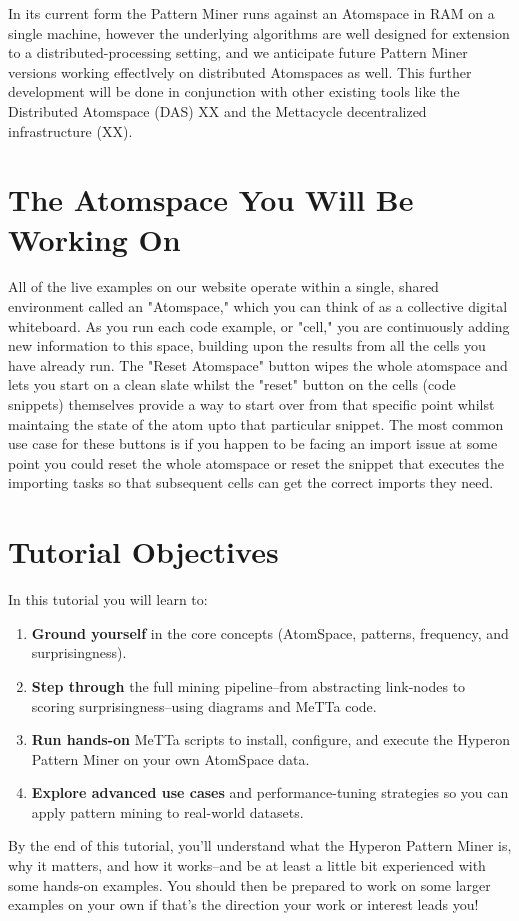 \documentclass{article}
\begin{document}
In its current form the Pattern Miner runs against an Atomspace in RAM on a single machine, however the underlying algorithms are well designed for extension to a distributed-processing setting, and we anticipate future Pattern Miner versions working effectlvely on distributed Atomspaces as well.   This further development will be done in conjunction with other existing tools like the Distributed Atomspace (DAS) XX and the Mettacycle decentralized infrastructure (XX).

\section{The Atomspace You Will Be Working On}

All of the live examples on our website operate within a single, shared environment called an "Atomspace," which you can think of as a collective digital whiteboard. As you run each code example, or "cell," you are continuously adding new information to this space, building upon the results from all the cells you have already run. The "Reset Atomspace" button wipes the whole atomspace and lets you start on a clean slate whilst the "reset" button on the cells (code snippets) themselves  provide a way to start over from that specific point whilst maintaing the state of the atom upto that particular snippet. The most common use case for these buttons is if you happen to be facing an import issue at some point you could reset the whole atomspace or reset the snippet that executes the importing tasks so that subsequent cells can get the correct imports they need. 

\section{Tutorial Objectives}

In this tutorial you will learn to:

\begin{enumerate}
  \item \textbf{Ground yourself} in the core concepts (AtomSpace, patterns, frequency, and surprisingness).
  \item \textbf{Step through} the full mining pipeline--from abstracting link-nodes to scoring surprisingness--using diagrams and MeTTa code.
  \item \textbf{Run hands-on} MeTTa scripts to install, configure, and execute the Hyperon Pattern Miner on your own AtomSpace data.
  \item \textbf{Explore advanced use cases} and performance-tuning strategies so you can apply pattern mining to real-world datasets.
\end{enumerate}

By the end of this tutorial, you'll understand what the Hyperon Pattern Miner is, why it matters, and how it works--and be at least a little bit experienced with some hands-on examples.   You should then be prepared to work on some larger examples on your own if that's the direction your work or interest leads you!
\end{document}
